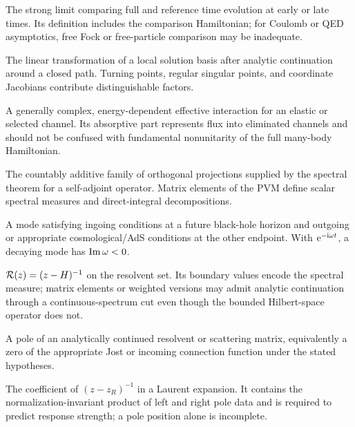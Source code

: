 \begin{description}[style=nextline]
  \item[M{\o}ller or wave operator.]
  The strong limit comparing full and reference time evolution at early or
  late times.  Its definition includes the comparison Hamiltonian; for
  Coulomb or QED asymptotics, free Fock or free-particle comparison may be
  inadequate.

  \item[Monodromy.]
  The linear transformation of a local solution basis after analytic
  continuation around a closed path.  Turning points, regular singular
  points, and coordinate Jacobians contribute distinguishable factors.

  \item[Nuclear optical potential.]
  A generally complex, energy-dependent effective interaction for an elastic
  or selected channel.  Its absorptive part represents flux into eliminated
  channels and should not be confused with fundamental nonunitarity of the
  full many-body Hamiltonian.

  \item[Projection-valued measure (PVM).]
  The countably additive family of orthogonal projections supplied by the
  spectral theorem for a self-adjoint operator.  Matrix elements of the PVM
  define scalar spectral measures and direct-integral decompositions.

  \item[Quasinormal mode (QNM).]
  A mode satisfying ingoing conditions at a future black-hole horizon and
  outgoing or appropriate cosmological/AdS conditions at the other endpoint.
  With $\mathrm{e}^{-\mathrm{i}\omega t}$, a decaying mode has $\operatorname{Im}\omega<0$.

  \item[Resolvent.]
  $\mathcal{R}(z)=(z-H)^{-1}$ on the resolvent set.  Its boundary values encode the
  spectral measure; matrix elements or weighted versions may admit analytic
  continuation through a continuous-spectrum cut even though the bounded
  Hilbert-space operator does not.

  \item[Resonance.] A pole of an analytically continued resolvent or
  scattering matrix, equivalently a zero of the appropriate Jost or incoming
  connection function under the stated hypotheses.

  \item[Residue.]
  The coefficient of $(z-z_R)^{-1}$ in a Laurent expansion.  It contains the
  normalization-invariant product of left and right pole data and is required
  to predict response strength; a pole position alone is incomplete.


\end{description}
